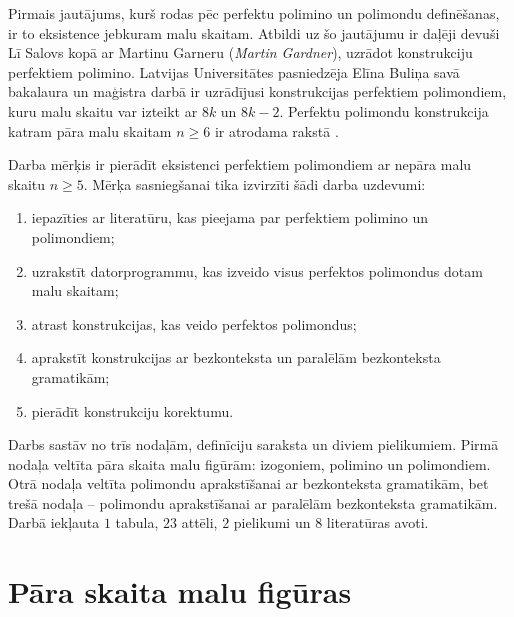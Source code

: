 \documentclass[utf8]{ludis2022}
\begin{document}
Pirmais jautājums, kurš rodas pēc perfektu polimino un polimondu definēšanas, ir to eksistence jebkuram malu skaitam. Atbildi uz šo jautājumu ir daļēji devuši Lī Salovs kopā ar Martinu Garneru ({\em Martin Gardner}), uzrādot konstrukciju perfektiem polimino. Latvijas Universitātes pasniedzēja Elīna Buliņa savā bakalaura un maģistra darbā ir uzrādījusi konstrukcijas perfektiem polimondiem, kuru malu skaitu var izteikt ar $8k$ un $8k-2$. Perfektu polimondu konstrukcija katram pāra malu skaitam $n \geq 6$ ir atrodama rakstā \cite{cibulis_bulina}.

Darba mērķis ir pierādīt eksistenci perfektiem polimondiem ar nepāra malu skaitu $n\geq 5$. Mērķa sasniegšanai tika izvirzīti šādi darba uzdevumi:

\vspace{-15pt}
\begin{enumerate}
\item iepazīties ar literatūru, kas pieejama par perfektiem polimino un polimondiem;
\vspace{-10pt}
\item uzrakstīt datorprogrammu, kas izveido visus perfektos polimondus dotam malu skaitam;
\vspace{-10pt}
\item atrast konstrukcijas, kas veido perfektos polimondus;
\vspace{-10pt}
\item aprakstīt konstrukcijas ar bezkonteksta un paralēlām bezkonteksta gramatikām;
\vspace{-10pt}
\item pierādīt konstrukciju korektumu. 
\end{enumerate}

\vspace{-10pt}
Darbs sastāv no trīs nodaļām, definīciju saraksta un diviem pielikumiem. Pirmā nodaļa veltīta pāra skaita malu figūrām: izogoniem, polimino un polimondiem. Otrā nodaļa veltīta polimondu aprakstīšanai ar bezkonteksta gramatikām, bet trešā nodaļa -- polimondu aprakstīšanai ar paralēlām bezkonteksta gramatikām. Darbā iekļauta $1$ tabula, $23$ attēli, $2$ pielikumi un $8$ literatūras avoti.








\newpage \section{Pāra skaita malu figūras}
\end{document}
